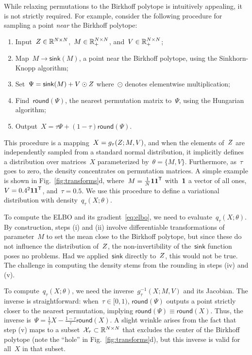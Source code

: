 \documentclass[twoside]{article}
\begin{document}
While relaxing permutations to the Birkhoff polytope is intuitively
appealing, it is not strictly required.  For example, consider the
following procedure for sampling a point \emph{near} the Birkhoff
polytope:
\begin{enumerate}[label=(\roman*)]
\item Input~${Z \in \mathbb{R}^{N \times N}}$,~${M \in \mathbb{R}_+^{N \times N}}$, and~${V \in \mathbb{R}_+^{N \times N}}$;
\item Map~$M \to \mathsf{sink}(M)$, a point near the Birkhoff polytope, using the Sinkhorn-Knopp algorithm;
\item Set~${\Psi = \mathsf{sink}(M) + V \odot Z}$ where~$\odot$ denotes elementwise multiplication;
\item Find~$\mathsf{round}(\Psi)$, the nearest permutation matrix to~$\Psi$, using the Hungarian algorithm;
\item Output~${X = \tau \Psi + (1-\tau) \mathsf{round}(\Psi)}$.
\end{enumerate}
This procedure is a mapping~$X = g_\tau(Z; M, V)$, and when the elements
of~$Z$ are independently sampled from a standard normal
distribution, it implicitly defines a distribution over matrices~$X$
parameterized by~${\theta = \{M, V\}}$. Furthermore, as~$\tau$ goes to
zero, the density concentrates on permutation matrices.  A simple
example is shown in Fig.~\ref{fig:transforms}d,
where~${M = \tfrac{1}{N}\boldsymbol{1} \boldsymbol{1}^{\mathsf{T}}}$ with~$\boldsymbol{1}$ a
vector of all ones,
${V = 0.4^2 \boldsymbol{1} \boldsymbol{1}^{\mathsf{T}}}$, and~${\tau=0.5}$. We use this procedure to define a variational
distribution with density~$q_\tau(X; \theta)$.

To compute the ELBO and its gradient~\eqref{eq:elbo}, we need to
evaluate~$q_\tau(X; \theta)$.  By construction, steps (i) and (ii) involve
differentiable transformations of parameter~$M$ to set the mean close
to the Birkhoff polytope, but since these do not influence the
distribution of~$Z$, the non-invertibility of
the~$\mathsf{sink}$ function poses no problems.  Had
we applied~$\mathsf{sink}$ directly to~$Z$, this would not be true.
The challenge in computing the density stems from the rounding in
steps (iv) and (v).

To compute~$q_\tau(X; \theta)$, we need the
inverse~$g_\tau^{-1}(X; M, V)$ and its Jacobian.  The inverse is
straightforward: when~${\tau \in [0,1)}$, $\mathsf{round}(\Psi)$
outputs a point strictly closer to the nearest permutation, implying
${\mathsf{round}(\Psi) \equiv \mathsf{round}(X)}$.  Thus, the inverse
is~${\Psi = \tfrac{1}{\tau}X - \tfrac{1-\tau}{\tau}
  \mathsf{round}(X)}$.  A slight wrinkle arises from the fact that
step (v) maps to a subset~${\mathcal{X}_\tau \subset \mathbb{R}^{N \times N}}$ that
excludes the center of the Birkhoff polytope (note the ``hole'' in
Fig.~\ref{fig:transforms}d), but this inverse is valid for all~$X$ in
that subset.
\end{document}
